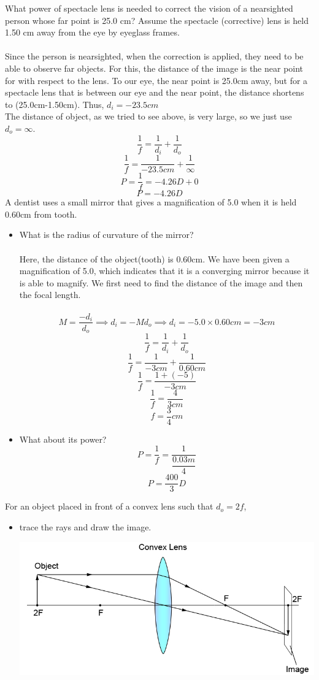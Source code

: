\documentclass[12pt,addpoints]{exam}
\begin{document}
{{{\begin{questions}
					\question What power of spectacle lens is needed to correct the vision of a nearsighted person whose far point is 25.0 cm? Assume the spectacle (corrective) lens is held 1.50 cm away from the eye by eyeglass frames.\\ \\
					Since the person is nearsighted, when the correction is applied, they need to be able to observe far objects. For this, the distance of the image is the near point for with respect to the lens. To our eye, the near point is 25.0cm away, but for a spectacle lens that is between our eye and the near point, the distance shortens to (25.0cm-1.50cm). Thus, $d_i=-23.5cm$ \\ 
					The distance of object, as we tried to see above, is very large, so we just use $d_o=\infty$.
					$$\dfrac{1}{f}=\dfrac{1}{d_i}+\dfrac{1}{d_o}$$
					$$\dfrac{1}{f}=\dfrac{1}{-23.5cm}+\dfrac{1}{\infty}$$
					$$P=\dfrac{1}{f}=-4.26 D + 0$$
					$$P=-4.26 D$$
					\question A dentist uses a small mirror that gives a magnification of 5.0 when it is held 0.60cm from tooth. 
					\begin{itemize}
						\item What is the radius of curvature of the mirror? \\ \\
						Here, the distance of the object(tooth) is 0.60cm. We have been given a magnification of 5.0, which indicates that it is a converging mirror because it is able to magnify. We first need to find the distance of the image and then the focal length.\\ \\
						$$M=\dfrac{-d_i}{d_o}\implies d_i=-Md_o\implies d_i=-5.0\times0.60cm=-3cm$$
						$$\dfrac{1}{f}=\dfrac{1}{d_i}+\dfrac{1}{d_o}$$
						$$\dfrac{1}{f}=\dfrac{1}{-3cm}+\dfrac{1}{0.60cm}$$
						$$\dfrac{1}{f}=\dfrac{1+(-5)}{-3cm}$$
						$$\dfrac{1}{f}=\dfrac{4}{3cm}$$
						$$f=\dfrac{3}{4}cm$$
						\item What about its power?
						$$P=\dfrac{1}{f}=\dfrac{1}{\dfrac{0.03m}{4}}$$
						$$P=\dfrac{400}{3}D$$
					\end{itemize}
					\question For an object placed in front of a convex lens such that $d_o=2f$,
					\begin{itemize}
						\item trace the rays and draw the image.
						\begin{center}
							\includegraphics[scale=1.25]{2f}

\end{center}
\end{itemize}
\end{questions}}}}
\end{document}

